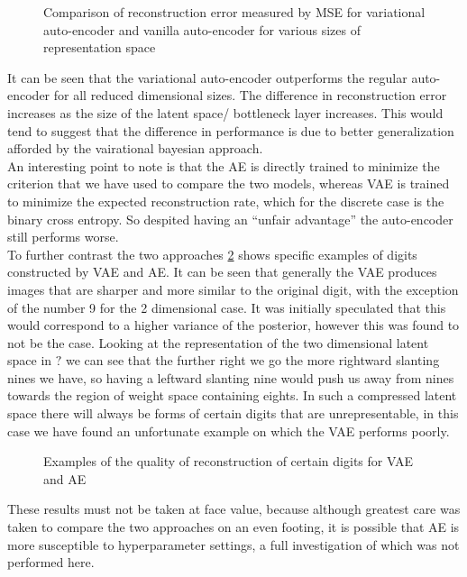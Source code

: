 \documentclass[../report.tex]{subfiles}
\begin{document}
\begin{figure}[hbt]
\centering
\hspace{0em}
\caption{Comparison of reconstruction error measured by MSE for variational auto-encoder and vanilla auto-encoder for various sizes of representation space}
\label{fig:AE_MSE}
\end{figure}

It can be seen that the variational auto-encoder outperforms the regular auto-encoder for all reduced dimensional sizes. The difference in reconstruction error increases as the size of the latent space/ bottleneck layer increases. This would tend to suggest that the difference in performance is due to better generalization afforded by the vairational bayesian approach.\\ An interesting point to note is that the AE is directly trained to minimize the criterion that we have used to compare the two models, whereas VAE is trained to minimize the expected reconstruction rate, which for the discrete case is the binary cross entropy. So despited having an ``unfair advantage'' the auto-encoder still performs worse.\\
To further contrast the two approaches \cref{fig:AE_recon} shows specific examples of digits constructed by VAE and AE. It can be seen that generally the VAE produces images that are sharper and more similar to the original digit, with the exception of the number 9 for the 2 dimensional case. It was initially speculated that this would correspond to a higher variance of the posterior, however this was found to not be the case. Looking at the representation of the two dimensional latent space in $?$ we can see that the further right we go the more rightward slanting nines we have, so having a leftward slanting nine would push us away from nines towards the region of weight space containing eights. In such a compressed latent space there will always be forms of certain digits that are unrepresentable, in this case we have found an unfortunate example on which the VAE performs poorly.\\

\begin{figure}[hbt]
\centering
\hspace{0em}
\caption{Examples of the quality of reconstruction of certain digits for VAE and AE}
\label{fig:AE_recon}
\end{figure}

These results must not be taken at face value, because although greatest care was taken to compare the two approaches on an even footing, it is possible that AE is more susceptible to hyperparameter settings, a full investigation of which was not performed here.\\
\end{document}
